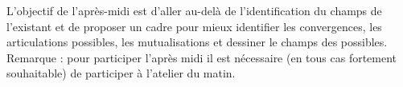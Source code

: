 L'objectif de l'après-midi est d'aller au-delà de l'identification du champs de l'existant et de proposer un cadre pour mieux identifier les convergences, les articulations possibles, les mutualisations et dessiner le champs des possibles. Remarque : pour participer l'après midi il est nécessaire (en tous cas fortement souhaitable) de participer à l'atelier du matin.